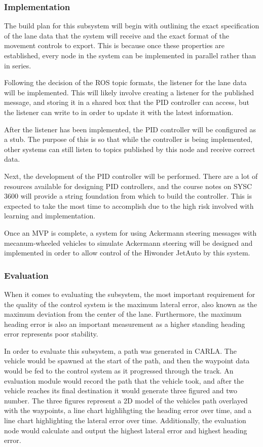 \documentclass[titlepage]{article}
\begin{document}
\subsubsection{Implementation}
The build plan for this subsystem will begin with outlining the exact specification of the lane data that the system will receive and the exact format of the movement controls to export. This is because once these properties are established, every node in the system can be implemented in parallel rather than in series.

Following the decision of the ROS topic formats,  the listener for the lane data will be implemented. This will likely involve creating a listener for the published message, and storing it in a shared box that the PID controller can access, but the listener can write to in order to update it with the latest information.

After the listener has been implemented, the PID controller will be configured as a stub. The purpose of this is so that while the controller is being implemented, other systems can still listen to topics published by this node and receive correct data.

Next, the development of the PID controller will be performed. There are a lot of resources available for designing PID controllers, and the course notes on SYSC 3600 will provide a string foundation from which to build the controller. This is expected to take the most time to accomplish due to the high risk involved with learning and implementation. 

Once an MVP is complete, a system for using Ackermann steering messages with mecanum-wheeled vehicles to simulate Ackermann steering will be designed and implemented in order to allow control of the Hiwonder JetAuto by this system.

\subsubsection{Evaluation}
When it comes to evaluating the subsystem, the most important requirement for the quality of the control system is the maximum lateral error, also known as the maximum deviation from the center of the lane. Furthermore, the maximum heading error is also an important measurement as a higher standing heading error represents poor stability.

In order to evaluate this subsystem, a path was generated in CARLA. The vehicle would be spawned at the start of the path, and then the waypoint data would be fed to the control system as it progressed through the track. An evaluation module would record the path that the vehicle took, and after the vehicle reaches its final destination it would generate three figured and two number. The three figures represent a 2D model of the vehicles path overlayed with the waypoints, a line chart highlihgting the heading error over time, and a line chart highlighting the lateral error over time. Additionally, the evaluation node would calculate and output the highest lateral error and highest heading error. 
\end{document}
